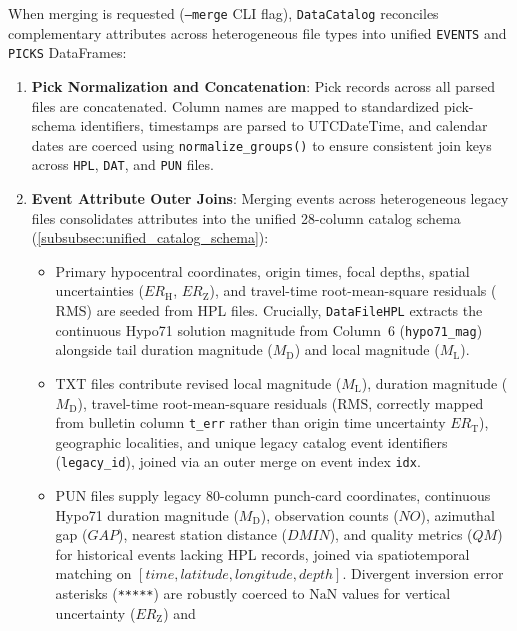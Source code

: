 When merging is requested (\texttt{--merge} CLI flag),
\texttt{DataCatalog} reconciles complementary attributes across
heterogeneous file types into unified \texttt{EVENTS} and
\texttt{PICKS} DataFrames:
\begin{enumerate}
  \item \textbf{Pick Normalization and Concatenation}: Pick records across all
    parsed files are concatenated. Column names are mapped to standardized
    pick-schema identifiers, timestamps are parsed to UTCDateTime, and calendar
    dates are coerced using \texttt{normalize\_groups()} to ensure consistent
    join keys across \texttt{HPL}, \texttt{DAT}, and \texttt{PUN} files.
  \item \textbf{Event Attribute Outer Joins}: Merging events across
    heterogeneous legacy files consolidates attributes into the unified
    28-column catalog schema (\cref{subsubsec:unified_catalog_schema}):
    \begin{itemize}
      \item Primary hypocentral coordinates, origin times, focal depths,
        spatial uncertainties ($ER_{\mathrm{H}}$, $ER_{\mathrm{Z}}$),
        and travel-time root-mean-square residuals ($\mathrm{RMS}$) are
        seeded from HPL files. Crucially, \texttt{DataFileHPL} extracts the
        continuous Hypo71 solution magnitude from Column~6
        (\texttt{hypo71\_mag})
        alongside tail duration magnitude ($M_{\mathrm{D}}$) and
        local magnitude ($M_{\mathrm{L}}$).
      \item TXT files contribute revised local magnitude ($M_{\mathrm{L}}$),
        duration magnitude ($M_{\mathrm{D}}$), travel-time root-mean-square
        residuals ($\mathrm{RMS}$, correctly mapped from bulletin column
        \texttt{t\_err} rather than origin time uncertainty $ER_{\mathrm{T}}$),
        geographic localities, and unique legacy catalog event identifiers
        (\texttt{legacy\_id}), joined via an outer merge on event
        index \texttt{idx}.
      \item PUN files supply legacy 80-column punch-card
        coordinates, continuous
        Hypo71 duration magnitude ($M_{\mathrm{D}}$), observation
        counts ($NO$),
        azimuthal gap ($GAP$), nearest station distance ($DMIN$), and quality
        metrics ($QM$) for historical events lacking HPL records, joined via
        spatiotemporal matching on $[time, latitude, longitude,
        depth]$. Divergent
        inversion error asterisks (\texttt{*****}) are robustly coerced to
        $\mathrm{NaN}$ values for vertical uncertainty ($ER_{\mathrm{Z}}$) and

\end{itemize}
\end{enumerate}
